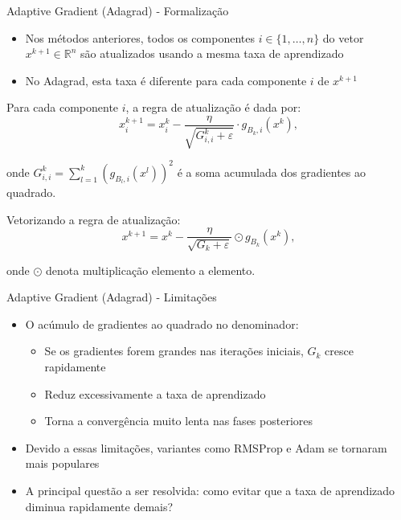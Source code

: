 \documentclass[aspectratio=1610]{beamer}
\begin{document}
\begin{frame}{Adaptive Gradient (Adagrad) - Formalização}
\begin{itemize}
    \item Nos métodos anteriores, todos os componentes $i \in \{1, \ldots, n\}$ do vetor $x^{k+1} \in \mathbb{R}^n$ são atualizados usando a mesma taxa de aprendizado
    \item No Adagrad, esta taxa é diferente para cada componente $i$ de $x^{k+1}$
\end{itemize}

Para cada componente $i$, a regra de atualização é dada por:
\begin{equation}
x_i^{k+1} = x_i^{k} - \frac{\eta}{\sqrt{G_{i,i}^{k} + \varepsilon}} \cdot g_{B_{k},i}(x^k),
\end{equation}

onde $G_{i,i}^{k} = \sum_{l=1}^{k} (g_{B_{l},i}(x^l))^2$ é a soma acumulada dos gradientes ao quadrado.

Vetorizando a regra de atualização:
\begin{equation}
x^{k+1} = x^k - \frac{\eta}{\sqrt{G_{k} + \varepsilon}} \odot g_{B_k}(x^k),
\end{equation}

onde $\odot$ denota multiplicação elemento a elemento.
\end{frame}

\begin{frame}{Adaptive Gradient (Adagrad) - Limitações}
\begin{itemize}
    \item O acúmulo de gradientes ao quadrado no denominador:
    \begin{itemize}
        \item Se os gradientes forem grandes nas iterações iniciais, $G_{k}$ cresce rapidamente
        \item Reduz excessivamente a taxa de aprendizado
        \item Torna a convergência muito lenta nas fases posteriores
    \end{itemize}
    \item Devido a essas limitações, variantes como RMSProp e Adam se tornaram mais populares
    \item A principal questão a ser resolvida: como evitar que a taxa de aprendizado diminua rapidamente demais?
\end{itemize}
\end{frame}
\end{document}
